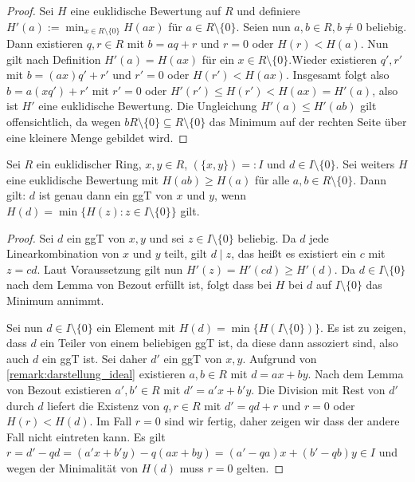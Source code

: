 \begin{proof}
    Sei $H$ eine euklidische Bewertung auf $R$ und definiere $H'(a):=\min_{x\in R\setminus\{0\}}H(ax)$ für $a\in R\setminus\{0\}$. Seien nun $a,b\in R, b\neq 0$ beliebig. Dann existieren $q,r\in R$ mit $b=aq+r$ und $r=0$ oder $H(r)<H(a)$. Nun gilt nach Definition $H'(a)=H(ax)$ für ein $x\in R\setminus\{0\}$.Wieder existieren $q',r'$ mit $b=(ax)q'+r'$ und $r'=0$ oder $H(r')<H(ax)$. Insgesamt folgt also $b=a(xq')+r'$ mit $r'=0$ oder $H'(r')\leq H(r')< H(ax) = H'(a)$, also ist $H'$ eine euklidische Bewertung. Die Ungleichung $H'(a)\le H'(ab)$ gilt offensichtlich, da wegen $bR\setminus\{0\}\subseteq R\setminus\{0\}$ das Minimum auf der rechten Seite über eine kleinere Menge gebildet wird.
\end{proof}

\begin{lemma}\label{lemma:minimaliaet_ggt_als_linearkombination}
    Sei $R$ ein euklidischer Ring, $x,y\in R$, $(\{x,y\})=:I$ und $d\in I\setminus\{0\}$. Sei weiters $H$ eine euklidische Bewertung mit $H(ab)\geq H(a)$ für alle $a,b\in R\setminus\{0\}$. Dann gilt: $d$ ist genau dann ein ggT von $x$ und $y$, wenn $H(d)=\min\{H(z):z\in I\setminus\{0\}\}$ gilt.
\end{lemma}

\begin{proof}
    Sei $d$ ein ggT von $x,y$ und sei $z\in I\setminus\{0\}$ beliebig. Da $d$ jede Linearkombination von $x$ und $y$ teilt, gilt $d\mid z$, das heißt es existiert ein $c$ mit $z=cd$. Laut Voraussetzung gilt nun $H'(z)=H'(cd)\geq H'(d)$. Da $d\in I\setminus\{0\}$ nach dem Lemma von Bezout erfüllt ist, folgt
    dass bei $H$ bei $d$ auf $I\setminus\{0\}$ das Minimum annimmt.

    Sei nun $d\in I\setminus\{0\}$ ein Element mit $H(d)=\min\{H(I\setminus\{0\})\}$. Es ist zu zeigen, dass $d$ ein Teiler von einem beliebigen ggT ist, da diese dann assoziert sind, also auch $d$ ein ggT ist. Sei daher $d'$ ein ggT von $x,y$. Aufgrund von \cref{remark:darstellung_ideal} existieren $a,b\in R$ mit $d=ax+by$. Nach dem Lemma von Bezout existieren $a',b'\in R$ mit $d'=a'x+b'y$. Die Division mit Rest von $d'$ durch $d$ liefert die Existenz von $q,r\in R$ mit $d'=qd+r$ und $r=0$ oder $H(r)<H(d)$. Im Fall $r=0$ sind wir fertig, daher zeigen wir dass der andere Fall nicht eintreten kann. Es gilt
    $r=d'-qd=(a'x+b'y)-q(ax+by)=(a'-qa)x+(b'-qb)y\in I$ und wegen der Minimalität von $H(d)$ muss $r=0$
    gelten.
\end{proof}

